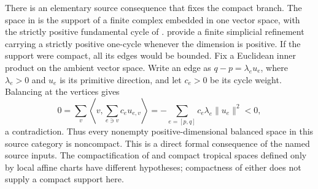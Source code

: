 


There is an elementary source consequence that fixes the compact branch.
The space in \cite[Definitions~2.2 and~2.4]{BMPS26} is the support of a
finite complex embedded in one vector space, with the strictly positive
fundamental cycle of \cite[Definition~2.27]{BMPS26}.
\cite[Proposition~3.11 and Lemma~3.25]{BMPS26} provide a finite
simplicial refinement carrying a strictly positive one-cycle whenever
the dimension is positive. If the support were compact, all its edges
would be bounded. Fix a Euclidean inner product on the ambient vector
space. Write an edge as $q-p=\lambda_e u_e$, where
$\lambda_e>0$ and $u_e$ is its primitive direction, and let $c_e>0$
be its cycle weight. Balancing at the vertices gives
\[
 0=\sum_v\left\langle v,\sum_{e\ni v}c_eu_{e,v}\right\rangle
   =-\sum_{e=[p,q]}c_e\lambda_e\lVert u_e\rVert^2<0,
\]
a contradiction. Thus every nonempty positive-dimensional balanced
space in this source category is noncompact. This is a direct formal
consequence of the named source inputs.
The compactification of \cite[Definition~2.13]{BMPS26} and compact
tropical spaces defined only by local affine charts have different
hypotheses; compactness of either does not supply a compact support here.

